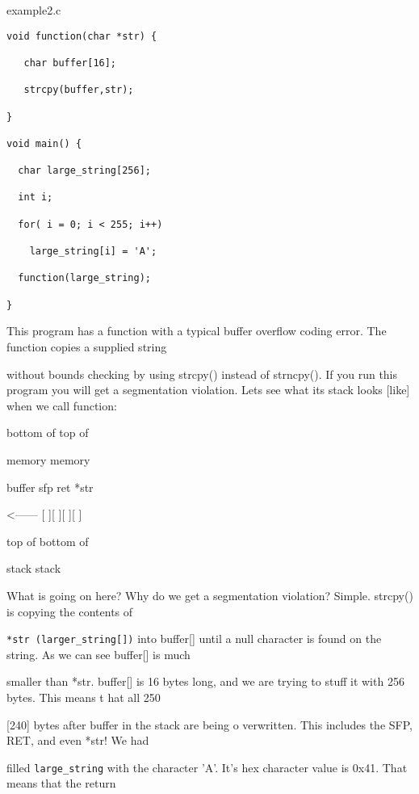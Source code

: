 \documentclass[10pt]{article}
\begin{document}
example2.c 

\begin{lstlisting}
void function(char *str) {

   char buffer[16];

   strcpy(buffer,str);

}

void main() {

  char large_string[256];

  int i;

  for( i = 0; i < 255; i++)

    large_string[i] = 'A';

  function(large_string);

}
\end{lstlisting}

This program has a function with a typical buffer overflow coding error. The function copies a supplied string 

without bounds checking by using strcpy() instead of strncpy(). If you run this program you will get a segmentation violation. Lets see what its stack looks [like] when we call function: 

bottom of                                                            top of

memory                                                               memory

                  buffer            sfp   ret   *str

<------          [                ][    ][    ][    ]

top of                                                            bottom of

stack                                                                 stack

What is going on here? Why do we get a segmentation violation? Simple. strcpy() is copying the contents of  

\verb+*str (larger_string[])+ into buffer[] until a null character  is found on the string. As we can see buffer[] is much 

smaller than *str. buffer[] is 16 bytes long, and we are trying to stuff it with 256 bytes. This means t hat all 250 

[240] bytes after buffer in the stack are being o verwritten. This includes the SFP, RET, and even *str! We had 

filled \verb+large_string+ with the character 'A'. It's hex character value is 0x41. That means that the return 
\end{document}

